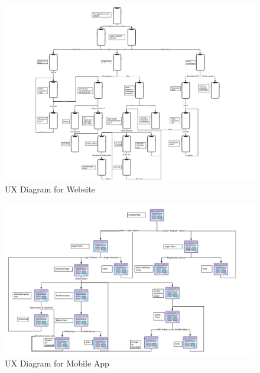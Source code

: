 \begin{figure}
        \includegraphics[width=\textwidth,height=\textheight,keepaspectratio]{assets/flowCharts/UXDiagramMobile.pdf}
    \caption{UX Diagram for Website}
    \label{fig:UXDiagram}
\end{figure}







\begin{figure}
        \includegraphics[width=\textwidth,height=\textheight,keepaspectratio]{assets/flowCharts/UXDiagramWebsite.pdf}
    \caption{UX Diagram for Mobile App}
    \label{fig:uxWebsite}
\end{figure}
